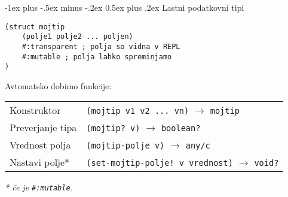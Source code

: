 \documentclass[a3paper,10pt]{extarticle}
\makeatletter
\renewcommand{\section}{\@startsection{section}{1}{0mm}%
                                {-1ex plus -.5ex minus -.2ex}%
                                {0.5ex plus .2ex}%
                                {\normalfont\large\bfseries}}
\makeatother
\begin{document}
\begin{multicols}{4}
\section{Lastni podatkovni tipi}
\begin{lstlisting}
(struct mojtip 
    (polje1 polje2 ... poljen) 
    #:transparent ; polja so vidna v REPL
    #:mutable ; polja lahko spreminjamo
)
\end{lstlisting}
Avtomatsko dobimo funkcije:

\begin{tabular}{@{}ll@{}}
    Konstruktor & \lstinline|(mojtip v1 v2 ... vn)| $\rightarrow$ \lstinline|mojtip|\\
    Preverjanje tipa & \lstinline|(mojtip? v)| $\rightarrow$ \lstinline|boolean?|\\
    Vrednost polja & \lstinline|(mojtip-polje v)| $\rightarrow$ \lstinline|any/c|\\
    Nastavi polje* & \lstinline|(set-mojtip-polje! v vrednost)| $\rightarrow$ \lstinline|void?|\\
\end{tabular}
\emph{* če je \lstinline|#:mutable|.}

\end{multicols}
\end{document}
